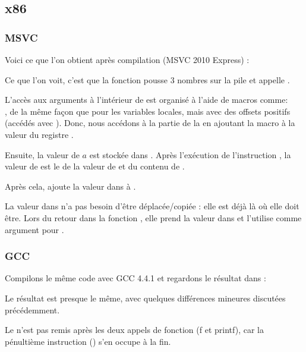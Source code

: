 \subsection{x86}

\subsubsection{MSVC}

Voici ce que l'on obtient après compilation (MSVC 2010 Express) :




Ce que l'on voit, c'est que la fonction \main pousse 3 nombres sur la pile et appelle
.

L'accès aux arguments à l'intérieur de \ttf est organisé à l'aide de macros
comme:\\
,
de la même façon que pour les variables locales, mais avec des offsets positifs
(accédés avec ).
Donc, nous accédons à la partie  de la 
en ajoutant la macro  à la valeur du registre \EBP.


Ensuite, la valeur de $a$ est stockée dans \EAX. Après l'exécution de l'instruction
\IMUL, la valeur de \EAX est le  de la valeur de \EAX
et du contenu de .

Après cela, \ADD ajoute la valeur dans  à \EAX.

La valeur dans \EAX n'a pas besoin d'être déplacée/copiée : elle est déjà là
où elle doit être.
Lors du retour dans la fonction , elle prend la valeur dans
\EAX et l'utilise comme argument pour \printf.



\subsubsection{GCC}

Compilons le même code avec GCC 4.4.1 et regardons le résultat dans \IDA :



Le résultat est presque le même, avec quelques différences mineures discutées
précédemment.

Le  n'est pas remis après les deux appels
de fonction (f et printf), car la pénultième instruction  ()
s'en occupe à la fin.
